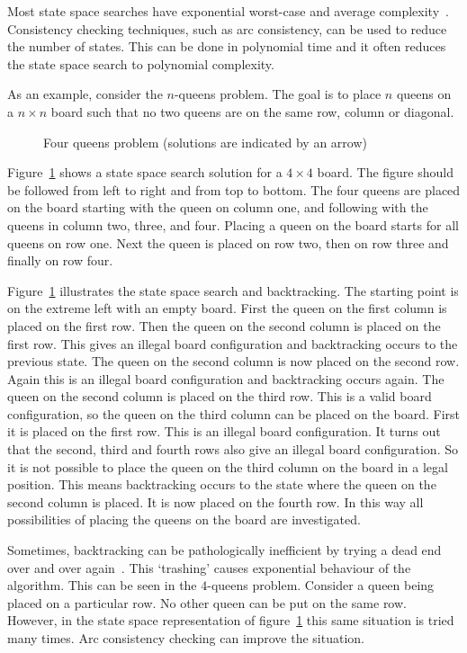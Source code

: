 \documentclass[a4paper,11pt]{article}
\begin{document}
Most state space searches have exponential worst-case and average
complexity~\cite{ai:mack}. 
Consistency checking techniques, such as
arc consistency,
can be used to reduce the number of states. This can be done in
polynomial time and it often reduces the state space search to polynomial
complexity.

As an example, consider the $n$-queens problem. The goal is to place $n$
queens on a $n \times n$ board such that no two queens are on the same
row, column or diagonal.
\begin{figure}[htbp]
\begin{center}
\caption{Four queens problem (solutions are indicated by an arrow)}
\label{fig:4queen-statespace}
\end{center}
\end{figure}
Figure~\ref{fig:4queen-statespace}
shows a state space
search solution for a $4 \times 4$ board.
The figure should be followed from left to right and from top to bottom.
The four queens are placed on the board starting with the queen on
column one, and following with the queens in column two, three, and four.
Placing
a queen on the board starts for all queens on row one. Next the queen
is placed on row two, then on row three and finally on row four. 

Figure~\ref{fig:4queen-statespace} illustrates
the state space search and backtracking.
The starting point is on the extreme left with an empty board.
First the queen on the first
column is placed on the first row. Then the queen on the second column is
placed on the first row. This gives an illegal board configuration
and backtracking occurs to the previous state.
The queen on the second column is now placed
on the second row. Again this is an illegal board configuration and
backtracking occurs again. The queen on the second column is placed
on the third row. This is a valid board configuration, so the queen
on the third column can be placed on the board. First it is placed
on the first row. This is an illegal board configuration. It turns
out that the second, third and fourth rows also give an illegal
board configuration. So it is not possible to place the queen on
the third column on the board in a legal position. This means backtracking
occurs to the state where the queen on the second column is placed.
It is now placed on the fourth
row. In this way all possibilities of placing the queens on the board
are investigated.

Sometimes, backtracking can be pathologically inefficient by trying a dead
end over and over again~\cite{article:bobrow}.
This `trashing' causes exponential behaviour of the algorithm.
This can be seen in the $4$-queens problem. Consider a queen
being placed on a particular row. No other queen can be put on the same row.
However, in the state space representation
of figure~\ref{fig:4queen-statespace} this same situation is tried many times.
Arc consistency checking can improve the situation.
\end{document}
